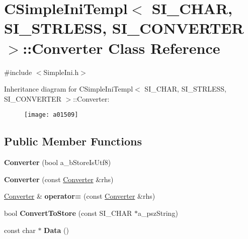 \hypertarget{a01509}{}\section{C\+Simple\+Ini\+Templ$<$ S\+I\+\_\+\+C\+H\+AR, S\+I\+\_\+\+S\+T\+R\+L\+E\+SS, S\+I\+\_\+\+C\+O\+N\+V\+E\+R\+T\+ER $>$\+:\+:Converter Class Reference}
\label{a01509}


{\ttfamily \#include $<$Simple\+Ini.\+h$>$}

Inheritance diagram for C\+Simple\+Ini\+Templ$<$ S\+I\+\_\+\+C\+H\+AR, S\+I\+\_\+\+S\+T\+R\+L\+E\+SS, S\+I\+\_\+\+C\+O\+N\+V\+E\+R\+T\+ER $>$\+:\+:Converter\+:\begin{figure}[H]
\begin{center}
\leavevmode
\texttt{[image: a01509]}
\end{center}
\end{figure}
\subsection*{Public Member Functions}
\begin{DoxyCompactItemize}
\item 
\mbox{\label{a01509_ab8e740b211e4ece127d4d25773ba7e42}} 
{\bfseries Converter} (bool a\+\_\+b\+Store\+Is\+Utf8)
\item 
\mbox{\label{a01509_a2f6e993014ed5d60c6e890e55beb0805}} 
{\bfseries Converter} (const \hyperlink{a01509}{Converter} \&rhs)
\item 
\mbox{\label{a01509_af858c01c6a7e4ce9fafd18abc9e0ac1b}} 
\hyperlink{a01509}{Converter} \& {\bfseries operator=} (const \hyperlink{a01509}{Converter} \&rhs)
\item 
\mbox{\label{a01509_a4e4186867214b54326cf622e323c9f2f}} 
bool {\bfseries Convert\+To\+Store} (const S\+I\+\_\+\+C\+H\+AR $\ast$a\+\_\+psz\+String)
\item 
\mbox{\label{a01509_a918bbd4f861a2872e148bc9481ac80bb}} 
const char $\ast$ {\bfseries Data} ()
\end{DoxyCompactItemize}


